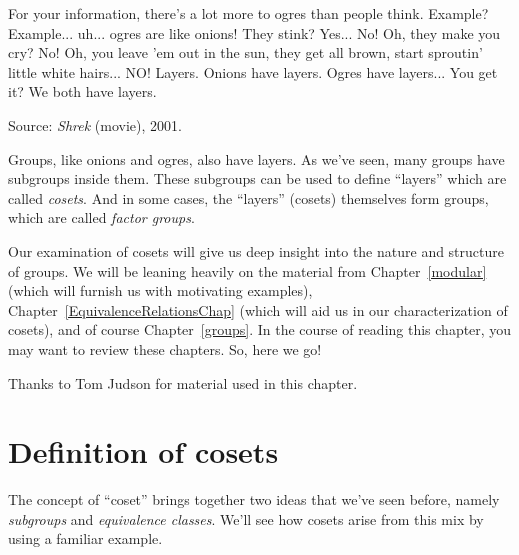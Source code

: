 
\begin{dialogue}
 For your information, there's a lot more to ogres than people think.
 Example?
 Example... uh... ogres are like onions!
 They stink?
 Yes... No!
 Oh, they make you cry?
 No!
 Oh, you leave 'em out in the sun, they get all brown, start sproutin' little white hairs...
  NO! Layers. Onions have layers. Ogres have layers... You get it? We both have layers.
\end{dialogue}
\medskip

\noindent
Source: \emph{Shrek} (movie), 2001.
\vspace{0.75 in}

Groups, like onions and ogres, also have layers. As we've seen, many groups have subgroups inside them. These subgroups can be used to define ``layers'' which are called \emph{cosets}. And in some cases, the ``layers'' (cosets) themselves form groups, which are called \emph{factor groups}. 

Our examination of cosets will give us deep insight into the nature and structure of groups. We will be leaning heavily on the material from Chapter~\ref{modular}  (which will furnish us with motivating examples), Chapter~\ref{EquivalenceRelationsChap} (which will aid us in our characterization of cosets), and of course Chapter~\ref{groups}.  In the course of reading this chapter, you may want to review these chapters.   So, here we go!
\medskip

Thanks to Tom Judson for material used in this chapter.

\section{Definition of cosets}\label{cosets:def}

The concept of ``coset'' brings together two ideas that we've seen before, namely \emph{subgroups} and \emph{equivalence classes}. We'll see how cosets arise from this mix by using a familiar example.

